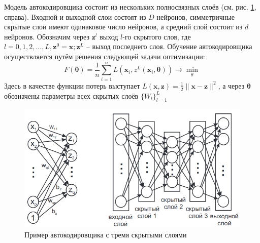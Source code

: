 \documentclass[12pt, a4paper]{article}
\begin{document}
        Модель автокодировщика состоит из нескольких полносвязных слоёв (см. рис. \ref{fig:net}, справа). Входной и выходной слои состоят из $D$ нейронов, симметричные скрытые слои имеют одинаковое число нейронов, а средний слой состоит из $d$ нейронов. Обозначим через $\boldsymbol{z}^l$ выход $l$-го скрытого слоя, где $l = 0, 1, 2, \dots, L, \boldsymbol{z}^0 = \boldsymbol{x}; \boldsymbol{z}^L$ -- выход последнего слоя. Обучение автокодировщика осуществляется путём решения следующей задачи оптимизации:
        $$F(\boldsymbol{\theta})=\frac{1}{n}\sum\limits_{i=1}^{n} L(\boldsymbol{x}_i, z^L(\boldsymbol{x}_i, \boldsymbol{\theta})) \rightarrow \min_\theta$$
        Здесь в качестве функции потерь выступает $L(\boldsymbol{x},\boldsymbol{z}) = \frac{1}{2}\lVert\boldsymbol{x}-\boldsymbol{z}\rVert^2$, а через $\boldsymbol{\theta}$ обозначены параметры всех скрытых слоёв $\{W_l\}_{l=1}^L$

        \begin{figure}
            \centering
            \includegraphics[width=0.8\linewidth]{net}
            \caption{Пример автокодировщика с тремя скрытыми слоями}
            \label{fig:net}
        \end{figure}
\end{document}
